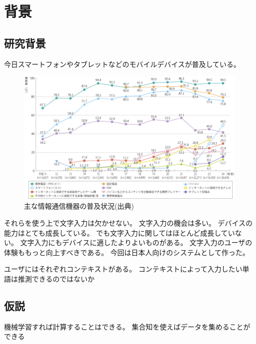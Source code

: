\chapter{背景}
\label{chap:background}

\section{研究背景}

今日スマートフォンやタブレットなどのモバイルデバイスが普及している。
\begin{figure}
  \begin{center}
    \includegraphics[width=14cm,bb=0 0 856 498]{images/internet.png}
    \caption{主な情報通信機器の普及状況(出典\cite{internet})}
    \label{internet}
  \end{center}
\end{figure}
それらを使う上で文字入力は欠かせない。
文字入力の機会は多い。
デバイスの能力はとても成長している。
でも文字入力に関してはほとんど成長していない。
文字入力にもデバイスに適したよりよいものがある。
文字入力のユーザの体験ももっと向上すべきである。
今回は日本人向けのシステムとして作った。

ユーザにはそれぞれコンテキストがある。
コンテキストによって入力したい単語は推測できるのではないか

\section{仮説}
機械学習すれば計算することはできる。
集合知を使えばデータを集めることができる
